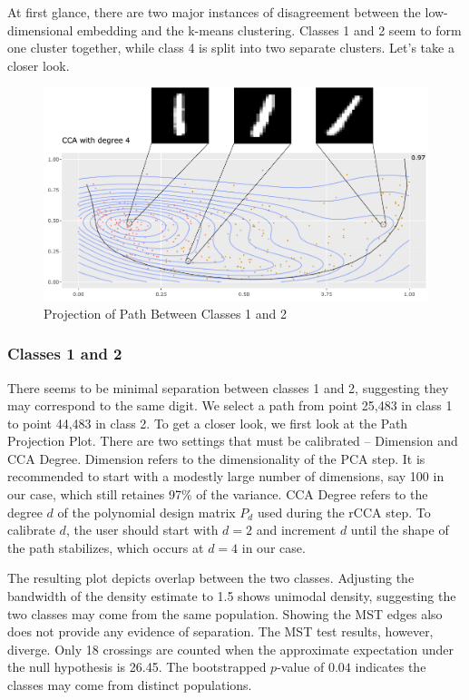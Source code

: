 \documentclass{article}
\begin{document}
At first glance, there are two major instances of disagreement between the low-dimensional embedding and the k-means clustering. Classes 1 and 2 seem to form one cluster together, while class 4 is split into two separate clusters. Let's take a closer look.

\renewcommand{\figurename}{Figure}
\renewcommand{\thefigure}{3}
\begin{figure}[!b]
\centering
\includegraphics[scale=0.4]{class 1+2 projection}
\caption{Projection of Path Between Classes 1 and 2}
\end{figure}

\subsubsection{Classes 1 and 2}
There seems to be minimal separation between classes 1 and 2, suggesting they may correspond to the same digit. We select a path from point 25,483 in class 1 to point 44,483 in class 2. To get a closer look, we first look at the Path Projection Plot. There are two settings that must be calibrated -- Dimension and CCA Degree. Dimension refers to the dimensionality of the PCA step. It is recommended to start with a modestly large number of dimensions, say 100 in our case, which still retaines 97\% of the variance. CCA Degree refers to the degree $d$ of the polynomial design matrix $P_d$ used during the rCCA step. To calibrate $d$, the user should start with $d = 2$ and increment $d$ until the shape of the path stabilizes, which occurs at $d = 4$ in our case.

The resulting plot depicts overlap between the two classes. Adjusting the bandwidth of the density estimate to 1.5 shows unimodal density, suggesting the two classes may come from the same population. Showing the MST edges also does not provide any evidence of separation. The MST test results, however, diverge. Only 18 crossings are counted when the approximate expectation under the null hypothesis is 26.45. The bootstrapped $p$-value of $0.04$ indicates the classes may come from distinct populations.
\end{document}
